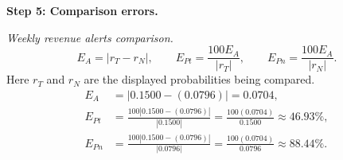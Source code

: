 \begin{enumerate}[leftmargin=*,label=\textbf{\arabic*.},itemsep=12pt,parsep=3pt,topsep=5pt]
\par\textbf{Step 5: Comparison errors.}\nopagebreak\enspace \par\noindent\begin{minipage}{\linewidth}
\par\textit{Weekly revenue alerts comparison.}
\[
E_A=|r_T-r_N|,\qquad E_{Pt}=\frac{100E_A}{|r_T|},\qquad E_{Pn}=\frac{100E_A}{|r_N|}.
\]
Here $r_T$ and $r_N$ are the displayed probabilities being compared.
\[
\begin{aligned}
E_A&=|0.1500-(0.0796)|=0.0704,\\
E_{Pt}&=\frac{100|0.1500-(0.0796)|}{|0.1500|}=\frac{100(0.0704)}{0.1500}\approx 46.93\%,\\
E_{Pn}&=\frac{100|0.1500-(0.0796)|}{|0.0796|}=\frac{100(0.0704)}{0.0796}\approx 88.44\%.
\end{aligned}
\]
\end{minipage}\par


\end{enumerate}
